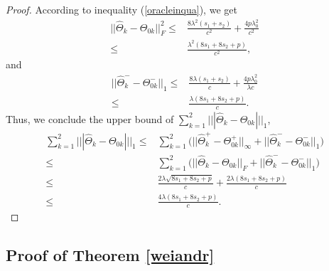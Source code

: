\documentclass[review]{elsarticle}
\newcommand{\1}{{\bf 1}}
\newcommand{\0}{{\bf 0}}
\newtheorem{proof}{Proof}
\begin{document}
\begin{appendices}
\begin{proof}
 According to inequality (\ref{oracleinqua}), we get
\begin{equation}
\begin{split}
||\widehat{\Theta}_k-\Theta_{0k}||_{F}^2\leq& \frac{8\lambda^2(s_1+s_2)}{c^2}+\frac{4p\lambda_0^2}{c^2}\\
\leq &\frac{\lambda^2(8s_1+8s_2+p)}{c^2},
\end{split}
\end{equation}
 and
\begin{equation}
\begin{split}
||\widehat{\Theta}_k^{-}-\Theta_{0k}^{-}||_{1}\leq& \frac{8\lambda(s_1+s_2)}{c}+\frac{4p\lambda_0^2}{\lambda c}\\
\leq &\frac{\lambda(8s_1+8s_2+p)}{c}.
\end{split}
\end{equation}
  Thus, we conclude the upper bound of $\sum_{k=1}^2|||\widehat{\Theta}_k-\Theta_{0k}|||_1$,
\begin{equation}
\begin{split}
\sum_{k=1}^2|||\widehat{\Theta}_k-\Theta_{0k}|||_1
\leq &
\sum_{k=1}^2\Big(||\widehat{\Theta}_k^{+}-\Theta_{0k}^{+}||_{\infty}
+||\widehat{\Theta}_k^{-}-\Theta_{0k}^{-}||_{1}\Big)\\
\leq &\sum_{k=1}^2\Big(||\widehat{\Theta}_k-\Theta_{0k}||_{F}
+||\widehat{\Theta}_k^{-}-\Theta_{0k}^{-}||_{1}\Big)\\
\leq &\frac{2\lambda\sqrt{8s_1+8s_2+p}}{c}+\frac{2\lambda(8s_1+8s_2+p)}{c}\\
\leq &\frac{4\lambda(8s_1+8s_2+p)}{c}.
\end{split}
\end{equation}

\end{proof}



\subsection{Proof of Theorem \ref{weiandr}}



\end{appendices}
\end{document}
